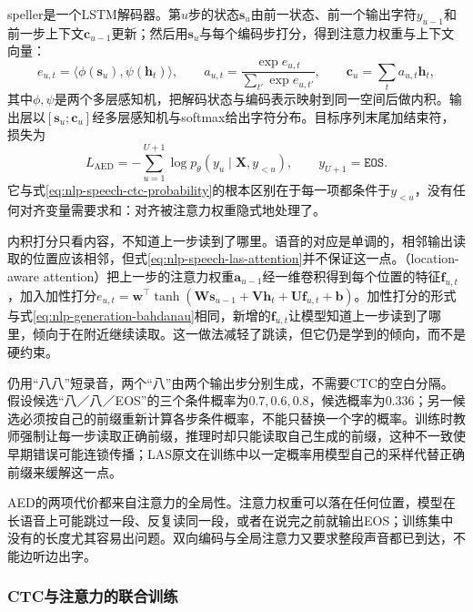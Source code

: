 speller是一个LSTM解码器。第$u$步的状态$\bm{s}_u$由前一状态、前一个输出字符$y_{u-1}$和前一步上下文$\bm{c}_{u-1}$更新；然后用$\bm{s}_u$与每个编码步打分，得到注意力权重与上下文向量：
\begin{equation}
 e_{u,t}=\langle\phi(\bm{s}_u),\psi(\bm{h}_t)\rangle,\qquad
 a_{u,t}=\frac{\exp e_{u,t}}{\sum_{t'}\exp e_{u,t'}},\qquad
 \bm{c}_u=\sum_{t}a_{u,t}\bm{h}_t,
 \label{eq:nlp-speech-las-attention}
\end{equation}
其中$\phi,\psi$是两个多层感知机，把解码状态与编码表示映射到同一空间后做内积。输出层以$[\bm{s}_u;\bm{c}_u]$经多层感知机与softmax给出字符分布。目标序列末尾加结束符，损失为
\begin{equation}
 L_{\mathrm{AED}}=-\sum_{u=1}^{U+1}
       \log p_\theta(y_u\mid\bm{X},y_{<u}),
 \qquad y_{U+1}=\texttt{EOS}.
 \label{eq:nlp-speech-las}
\end{equation}
它与式\eqref{eq:nlp-speech-ctc-probability}的根本区别在于每一项都条件于$y_{<u}$，没有任何对齐变量需要求和：对齐被注意力权重隐式地处理了。

内积打分只看内容，不知道上一步读到了哪里。语音的对应是单调的，相邻输出读取的位置应该相邻，但式\eqref{eq:nlp-speech-las-attention}并不保证这一点。（location-aware attention）把上一步的注意力权重$\bm{a}_{u-1}$经一维卷积得到每个位置的特征$\bm{f}_{u,t}$，加入加性打分$e_{u,t}=\bm{w}^{\top}\tanh(\bm{W}\bm{s}_{u-1}+\bm{V}\bm{h}_t+\bm{U}\bm{f}_{u,t}+\bm{b})$。加性打分的形式与式\eqref{eq:nlp-generation-bahdanau}相同，新增的$\bm{f}_{u,t}$让模型知道上一步读到了哪里，倾向于在附近继续读取。这一做法减轻了跳读，但它仍是学到的倾向，而不是硬约束。

仍用“八八”短录音，两个“八”由两个输出步分别生成，不需要CTC的空白分隔。假设候选“八／八／EOS”的三个条件概率为$0.7,0.6,0.8$，候选概率为$0.336$；另一候选必须按自己的前缀重新计算各步条件概率，不能只替换一个字的概率。训练时教师强制让每一步读取正确前缀，推理时却只能读取自己生成的前缀，这种不一致使早期错误可能连锁传播；LAS原文在训练中以一定概率用模型自己的采样代替正确前缀来缓解这一点。

AED的两项代价都来自注意力的全局性。注意力权重可以落在任何位置，模型在长语音上可能跳过一段、反复读同一段，或者在说完之前就输出EOS；训练集中没有的长度尤其容易出问题。双向编码与全局注意力又要求整段声音都已到达，不能边听边出字。

\subsubsection{CTC与注意力的联合训练}
\label{sec:nlp-speech-joint-ctc-attention}

